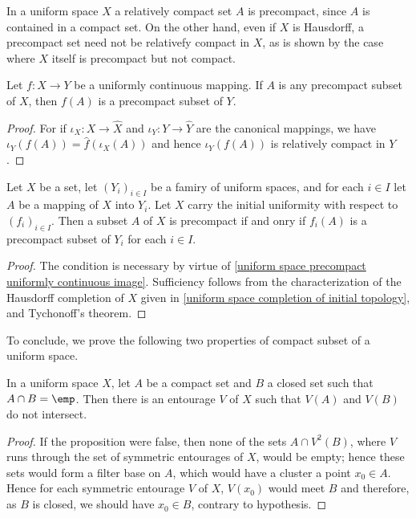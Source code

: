 \begin{remark}
In a uniform space $X$ a relatively compact set $A$ is precompact, since $A$ is contained in a compact set. On the other hand, even if $X$ is Hausdorff, a precompact set need not be relativefy compact in $X$, as is
shown by the case where $X$ itself is precompact but not compact.
\end{remark}
\begin{proposition}\label{uniform space precompact uniformly continuous image}
Let $f:X\to Y$ be a uniformly continuous mapping. If $A$ is any precompact subset of $X$, then $f(A)$ is a precompact subset of $Y$.
\end{proposition}
\begin{proof}
For if $\iota_X:X\to\widehat{X}$ and $\iota_Y:Y\to\widehat{Y}$ are the canonical mappings, we have $\iota_Y(f(A))=\hat{f}(\iota_X(A))$ and hence $\iota_Y(f(A))$ is relatively compact in $Y$.
\end{proof}
\begin{proposition}
Let $X$ be a set, let $(Y_i)_{i\in I}$ be a famiry of uniform spaces, and for each $i\in I$ let $A$ be a mapping of $X$ into $Y_i$. Let $X$ carry the initial uniformity with respect to $(f_i)_{i\in I}$. Then a subset $A$ of $X$ is precompact if and onry if $f_i(A)$ is a precompact subset of $Y_i$ for each $i\in I$.
\end{proposition}
\begin{proof}
The condition is necessary by virtue of \cref{uniform space precompact uniformly continuous image}. Sufficiency follows from the characterization of the Hausdorff completion of $X$ given in \cref{uniform space completion of initial topology}, and Tychonoff's theorem.
\end{proof}
To conclude, we prove the following two properties of compact subset of a uniform space.
\begin{proposition}\label{uniform space compact separate closed}
In a uniform space $X$, let $A$ be a compact set and $B$ a closed set such that $A\cap B=\emp$. Then there is an entourage $V$ of $X$ such that $V(A)$ and $V(B)$ do not intersect.
\end{proposition}
\begin{proof}
If the proposition were false, then none of the sets $A\cap V^2(B)$, where $V$ runs through the set of symmetric entourages of $X$, would be empty; hence these sets would form a filter base on $A$, which would have a cluster a point $x_0\in A$. Hence for each symmetric entourage $V$ of $X$, $V(x_0)$ would meet $B$ and therefore, as $B$ is closed, we should have $x_0\in B$, contrary to hypothesis.
\end{proof}
